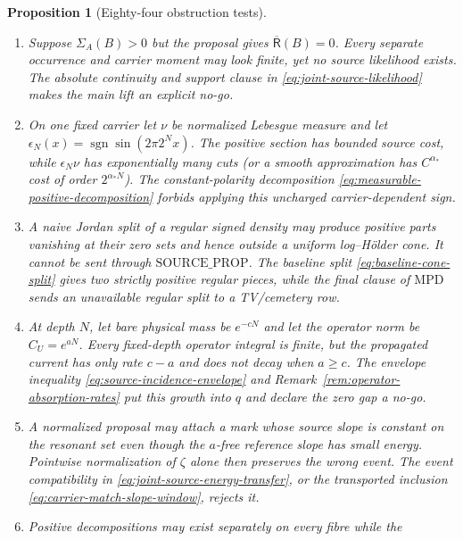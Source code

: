 \documentclass[11pt]{article}
\newtheorem{proposition}[theorem]{Proposition}
\begin{document}
\begin{proposition}[Eighty-four obstruction tests]
\begin{enumerate}[label=\textup{(T\arabic*)}]
      $\|d\mathsf R_0(\cdot\mid A)/d\mathsf R_0\|_p
       =\delta^{-1/p'}$.  A scale-free normalized selected likelihood would
      hide exactly this blow-up.  Equation
      \eqref{eq:selection-safe-likelihood-rates} records it, and
      \eqref{eq:source-value-small-ball} rejects a nonpositive resulting
      gap.
\item Suppose $\Sigma_A(B)>0$ but the proposal gives
      $\overline{\mathsf R}(B)=0$.  Every separate occurrence and carrier
      moment may look finite, yet no source likelihood exists.  The absolute
      continuity and support clause in \eqref{eq:joint-source-likelihood}
      makes the main lift an explicit no-go.
\item On one fixed carrier let $\nu$ be normalized Lebesgue measure and let
      $\epsilon_N(x)=\operatorname{sgn}\sin(2\pi2^Nx)$.  The positive
      section has bounded source cost, while $\epsilon_N\nu$ has
      exponentially many cuts (or a smooth approximation has
      $C^{\alpha_*}$ cost of order $2^{\alpha_*N}$).  The constant-polarity
      decomposition \eqref{eq:measurable-positive-decomposition} forbids
      applying this uncharged carrier-dependent sign.
\item A naive Jordan split of a regular signed density may produce positive
      parts vanishing at their zero sets and hence outside a uniform
      log--H\"older cone.  It cannot be sent through
      $\mathrm{SOURCE\_PROP}$.  The baseline split
      \eqref{eq:baseline-cone-split} gives two strictly positive regular
      pieces, while the final clause of $\mathrm{MPD}$ sends an unavailable
      regular split to a TV/cemetery row.
\item At depth $N$, let bare physical mass be $e^{-cN}$ and let the operator
      norm be $C_U=e^{aN}$.  Every fixed-depth operator integral is finite,
      but the propagated current has only rate $c-a$ and does not decay when
      $a\ge c$.  The envelope inequality
      \eqref{eq:source-incidence-envelope} and
      Remark~\ref{rem:operator-absorption-rates} put this growth into $q$ and
      declare the zero gap a no-go.
\item A normalized proposal may attach a mark whose source slope is constant
      on the resonant set even though the $a$-free reference slope has small
      energy.  Pointwise normalization of $\zeta$ alone then preserves the
      wrong event.  The event compatibility in
      \eqref{eq:joint-source-energy-transfer}, or the transported inclusion
      \eqref{eq:carrier-match-slope-window}, rejects it.
\item Positive decompositions may exist separately on every fibre while the

\end{enumerate}
\end{proposition}
\end{document}

